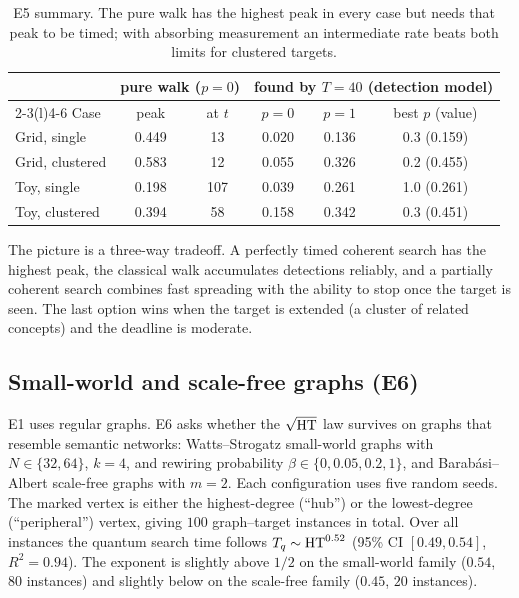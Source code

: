 \begin{table}[t]
  \centering
  \small
  \begin{tabular}{@{}lccccc@{}}
    \toprule
    & \multicolumn{2}{c}{pure walk ($p=0$)}
    & \multicolumn{3}{c}{found by $T=40$ (detection model)} \\
    \cmidrule(lr){2-3}\cmidrule(l){4-6}
    Case & peak & at $t$ & $p=0$ & $p=1$ & best $p$ (value) \\
    \midrule
    Grid, single & 0.449 & 13 & 0.020 & 0.136 & 0.3 (0.159) \\
    Grid, clustered & 0.583 & 12 & 0.055 & 0.326 & 0.2 (0.455) \\
    Toy, single & 0.198 & 107 & 0.039 & 0.261 & 1.0 (0.261) \\
    Toy, clustered & 0.394 & 58 & 0.158 & 0.342 & 0.3 (0.451) \\
    \bottomrule
  \end{tabular}
  \caption{E5 summary. The pure walk has the highest peak in every case but
  needs that peak to be timed; with absorbing measurement an intermediate rate
  beats both limits for clustered targets.}
  \label{tab:e5}
\end{table}

The picture is a three-way tradeoff. A perfectly timed coherent search has the
highest peak, the classical walk accumulates detections reliably, and a
partially coherent search combines fast spreading with the ability to stop
once the target is seen. The last option wins when the target is extended
(a cluster of related concepts) and the deadline is moderate.

\FloatBarrier
\subsection{Small-world and scale-free graphs (E6)}
\label{sec:results-e6}

E1 uses regular graphs. E6 asks whether the $\sqrt{\mathrm{HT}}$ law survives on
graphs that resemble semantic networks: Watts--Strogatz small-world graphs with
$N\in\{32,64\}$, $k=4$, and rewiring probability $\beta\in\{0,0.05,0.2,1\}$, and
Barab\'asi--Albert scale-free graphs with $m=2$. Each configuration uses five
random seeds. The marked vertex is either the highest-degree (``hub'') or the
lowest-degree (``peripheral'') vertex, giving $100$ graph--target instances in
total. Over all instances the quantum search time follows
$T_q\sim\mathrm{HT}^{0.52}$ (95\% CI $[0.49,0.54]$, $R^2=0.94$). The exponent is
slightly above $1/2$ on the small-world family ($0.54$, $80$ instances) and
slightly below on the scale-free family ($0.45$, $20$ instances).

